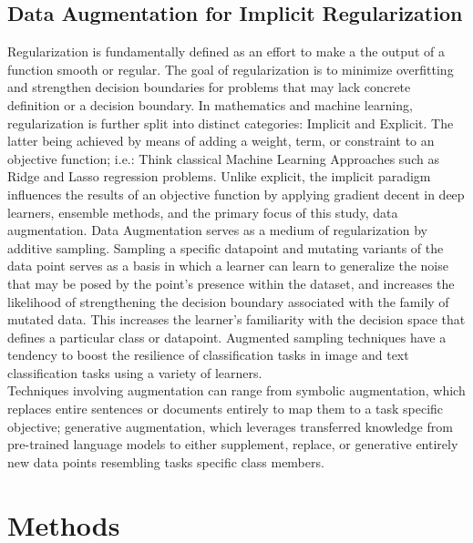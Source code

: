 \documentclass{article}
\begin{document}
\subsection{Data Augmentation for Implicit Regularization}
Regularization is fundamentally defined as an effort to make a the output of a function smooth or regular. The goal of regularization is to minimize overfitting and strengthen decision boundaries for problems that may lack concrete definition or a decision boundary. In mathematics and machine learning, regularization  is further split into distinct categories: Implicit and Explicit. The latter being achieved by means of adding a weight, term, or constraint to an objective function; i.e.: Think classical Machine Learning Approaches such as Ridge and Lasso regression problems. Unlike explicit, the implicit paradigm influences the results of an objective function by applying gradient decent in deep learners, ensemble methods, and the primary focus of this study,  data augmentation. Data Augmentation serves as a medium of regularization by additive sampling. Sampling a specific datapoint and mutating variants of the data point serves as a basis in which a learner can learn to generalize the noise that may be posed by the point's presence within the dataset, and increases the likelihood of strengthening the decision boundary associated with the family of mutated data. This increases the learner's familiarity with the decision space that defines a particular class or datapoint. Augmented sampling techniques have a tendency to boost the resilience of classification tasks in image and text classification tasks using a variety of learners. 
\\ Techniques involving augmentation can range from symbolic augmentation, which replaces entire sentences or documents entirely to map them to a task specific objective; generative augmentation, which leverages transferred knowledge from pre-trained language models to either supplement, replace, or generative entirely new data points resembling tasks specific class members.


\section{Methods}
\end{document}
